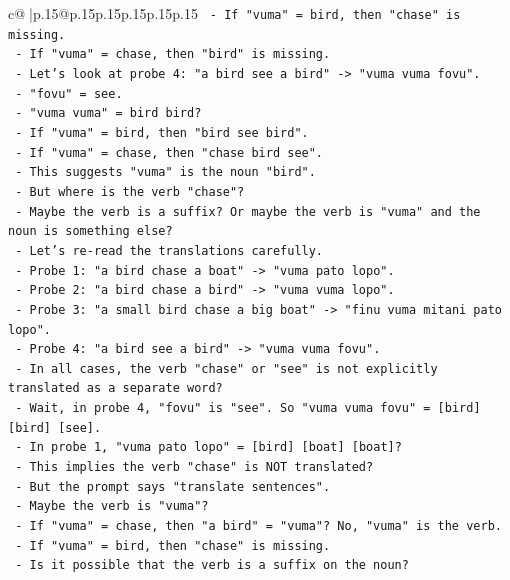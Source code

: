 \documentclass{article}
\begin{document}
{\begin{supertabular}{c@{$\;$}|p{.15\linewidth}@{}p{.15\linewidth}p{.15\linewidth}p{.15\linewidth}p{.15\linewidth}p{.15\linewidth}}
{{{\texttt{  {-} If "vuma" = bird, then "chase" is missing.} \\
\texttt{  {-} If "vuma" = chase, then "bird" is missing.} \\
\texttt{  {-} Let's look at probe 4: "a bird see a bird" {-}> "vuma vuma fovu".} \\
\texttt{    {-} "fovu" = see.} \\
\texttt{    {-} "vuma vuma" = bird bird?} \\
\texttt{    {-} If "vuma" = bird, then "bird see bird".} \\
\texttt{    {-} If "vuma" = chase, then "chase bird see".} \\
\texttt{    {-} This suggests "vuma" is the noun "bird".} \\
\texttt{    {-} But where is the verb "chase"?} \\
\texttt{    {-} Maybe the verb is a suffix? Or maybe the verb is "vuma" and the noun is something else?} \\
\texttt{    {-} Let's re{-}read the translations carefully.} \\
\texttt{    {-} Probe 1: "a bird chase a boat" {-}> "vuma pato lopo".} \\
\texttt{    {-} Probe 2: "a bird chase a bird" {-}> "vuma vuma lopo".} \\
\texttt{    {-} Probe 3: "a small bird chase a big boat" {-}> "finu vuma mitani pato lopo".} \\
\texttt{    {-} Probe 4: "a bird see a bird" {-}> "vuma vuma fovu".} \\
\texttt{    {-} In all cases, the verb "chase" or "see" is not explicitly translated as a separate word?} \\
\texttt{    {-} Wait, in probe 4, "fovu" is "see". So "vuma vuma fovu" = {[}bird{]} {[}bird{]} {[}see{]}.} \\
\texttt{    {-} In probe 1, "vuma pato lopo" = {[}bird{]} {[}boat{]} {[}boat{]}?} \\
\texttt{    {-} This implies the verb "chase" is NOT translated?} \\
\texttt{    {-} But the prompt says "translate sentences".} \\
\texttt{    {-} Maybe the verb is "vuma"?} \\
\texttt{    {-} If "vuma" = chase, then "a bird" = "vuma"? No, "vuma" is the verb.} \\
\texttt{    {-} If "vuma" = bird, then "chase" is missing.} \\
\texttt{    {-} Is it possible that the verb is a suffix on the noun?} \\
}}}
\end{supertabular}}
\end{document}
